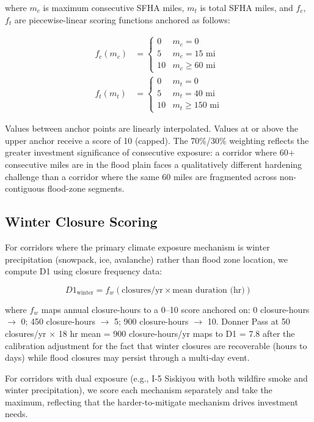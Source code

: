 where $m_c$ is maximum consecutive SFHA miles, $m_t$ is total SFHA miles, and $f_c$, $f_t$
are piecewise-linear scoring functions anchored as follows:

\begin{align}
f_c(m_c) &= \begin{cases}
0 & m_c = 0 \\
5 & m_c = 15 \text{ mi} \\
10 & m_c \geq 60 \text{ mi}
\end{cases} \\[6pt]
f_t(m_t) &= \begin{cases}
0 & m_t = 0 \\
5 & m_t = 40 \text{ mi} \\
10 & m_t \geq 150 \text{ mi}
\end{cases}
\end{align}

Values between anchor points are linearly interpolated. Values at or above the upper anchor
receive a score of 10 (capped). The 70\%/30\% weighting reflects the greater investment
significance of consecutive exposure: a corridor where 60+ consecutive miles are in the
flood plain faces a qualitatively different hardening challenge than a corridor where the
same 60 miles are fragmented across non-contiguous flood-zone segments.

\subsection{Winter Closure Scoring}

For corridors where the primary climate exposure mechanism is winter precipitation (snowpack,
ice, avalanche) rather than flood zone location, we compute D1 using closure frequency data:

\begin{equation}
D1_{\text{winter}} = f_w\!\left(\text{closures/yr} \times \text{mean duration (hr)}\right)
\end{equation}

where $f_w$ maps annual closure-hours to a 0--10 score anchored on: 0 closure-hours $\to$ 0;
450 closure-hours $\to$ 5; 900 closure-hours $\to$ 10. Donner Pass at 50 closures/yr $\times$
18 hr mean = 900 closure-hours/yr maps to D1 = 7.8 after the calibration adjustment for the
fact that winter closures are recoverable (hours to days) while flood closures may persist
through a multi-day event.

For corridors with dual exposure (e.g., I-5 Siskiyou with both wildfire smoke and winter
precipitation), we score each mechanism separately and take the maximum, reflecting that the
harder-to-mitigate mechanism drives investment needs.

